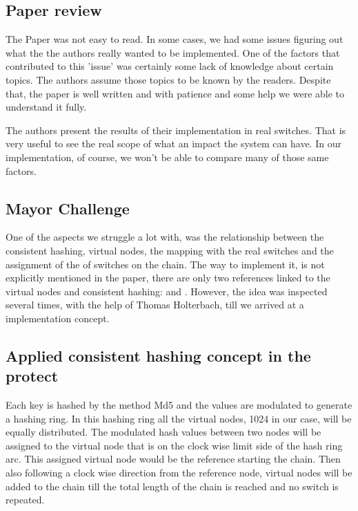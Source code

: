 \documentclass[11pt,oneside,a4paper]{article}
\begin{document}
\subsection{Paper review}

The Paper was not easy to read. In some cases, we had some issues figuring out what the the authors really wanted to be implemented. One of the factors that contributed to this 'issue' was certainly some lack of knowledge about certain topics. The authors assume those topics to be known by the readers. Despite that, the paper is well written and with patience and some help we were able to understand it fully. 

The authors present the results of their implementation in real switches. That is very useful to see the real scope of what an impact the system can have. In our implementation, of course, we won't be able to compare many of those same factors.

\subsection{Mayor Challenge}

One of the aspects we struggle a lot with, was the relationship between the consistent hashing, virtual nodes, the mapping with the real switches and the assignment of the of switches on the chain. The way to implement it, is not explicitly mentioned in the paper, there are only two references linked to the virtual nodes and consistent hashing: \cite{consistentHashing1997} and \cite{CoopStorage}. However, the idea was inspected several times, with the help of Thomas Holterbach, till we arrived at a implementation concept.

\subsection{Applied consistent hashing concept in the protect}

Each key is hashed by the method Md5 and the values are modulated to generate a hashing ring. In this hashing ring all the virtual nodes, 1024 in our case, will be equally distributed. The modulated hash values between two nodes will be assigned to the virtual node that is on the clock wise limit side of the hash ring arc. This assigned virtual node would be the reference starting the chain. Then also following a clock wise direction from the reference node, virtual nodes will be added to the chain till the total length of the chain is reached and no switch is repeated. 
\end{document}

